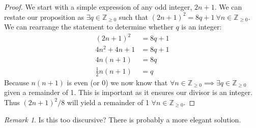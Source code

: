 \documentclass[12pt]{article}
\theoremstyle{remark}  %
\newtheorem*{remark}{Remark}
\begin{document}
    \begin{proof}
        We start with a simple expression of any odd integer, $2n+1$. We can restate our proposition as $\exists q \in \mathbb{Z}_{\geq 0}$ such that $(2n+1)^2=8q+1 \ \forall n\in\mathbb{Z}_{\geq 0}$. We can rearrange the statement to determine whether $q$ is an integer:
        \begin{align*}
            (2n+1)^2 &= 8q+1 \\
            4n^2+4n+1 &= 8q+1 \\
            4n(n+1) &= 8q \\
            \frac{1}{2}n(n+1) &= q
        \end{align*}
        Because $n(n+1)$ is even (or 0) we now know that $\forall n\in \mathbb{Z}_{\geq0} \implies \exists q\in \mathbb{Z}_{\geq0}$ given a remainder of 1. This is important as it ensures our divisor is an integer. Thus $(2n+1)^2/8$ will yield a remainder of 1 $\forall n\in \mathbb{Z}_{\geq0}$.
    \end{proof}
    \begin{remark}
        Is this too discursive? There is probably a more elegant solution.
    \end{remark}
\vspace{.5em}
\end{document}
